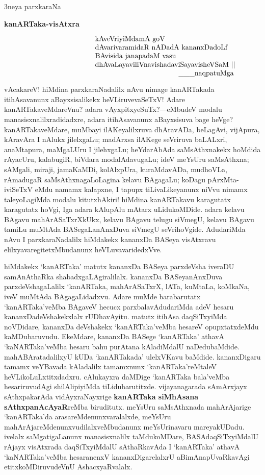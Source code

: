 \documentclass[11pt,a4size]{article}
\begin{document}
\newpage


\begin{center}
{\Huge 3neya parxkaraNa}

\smallskip
\textbf{\LARGE kanARTaka-visAtxra}
\end{center}

$$
\vbox{\parskip=0pt\parindent=0pt \everypar{\hskip12em} \obeylines
kAveVriyiMdamA goV
dAvarivaramidaR nADadA kananxDadoLf
BAvisida janapadaM vasu
dhAvaLayaviliVnavishadaviSayavisheVSaM ||

\hspace{4cm} \_\_\_naqpatuMga}\index{naqpatuMga}
$$

vAcakareV! hiMdina parxkaraNadalilx nAvu nimage kanARTakada
itihAsavanunx aBayxsisalikekx heVLiruvevaSeTxV! Adare
kanARTakaveMdareVnu? adara vAyxpitxyeSuTx?---eMbudeV modalu
manasisxnalilxradidadxre, adara itihAsavanunx aBayxsisuva bage heVge?
kanARTakaveMdare, muMbayi ilAKeyalilxruva dhAravADa, beLagAvi,
vijApura, kAravAra I nAlukx jilelxgaLu; madArxsa ilAKege seVriruva
baLALxri, anaMtapura, maMgaLUru I jilehxgaLu; heYdarAbAda
saMsAthxnakekx hoMdida rAyacUru, kalabugiR, biVdara modalAdavugaLu;
ideV meYsUru saMsAthxna; sAMgali, miraji, jamaKaMDi, kolAlxpUra,
kuraMdavADa, mudhoVLa, rAmadugaR saMsAthxnagaLoLagina kelavu BAgagaLu;
koDagu pArxMta-iviSeTxV eMdu namamx kalapxne, I tapupx
tiLivaLikeyanunx niVvu nimamx taleyoLagiMda modalu kitutxhAkiri!
hiMdina kanARTakavu karagutatx karagutatx hoVgi, Iga adara kAlupAlu
mAtarx uLidukoMDide. adara kelavu BAgavu mahArASaTxrXkUkx, kelavu
BAgavu telugu siVmegU, kelavu BAgavu tamiLu muMtAda BASegaLanAnxDuva
siVmegU seVrihoVgide. AdudariMda nAvu I parxkaraNadalilx hiMdakekx
kananxDa BASeya visAtxravu elilxyavaregitetxMbudanunx
heVLuvavaridedxVve.

hiMdakekx `kanARTaka' matutx kananxDa BASeya parxdeVsha iveraDU
samAnAthaRka shabadxgaLAgiralilalx. kananxDa BASeyanAnxDuva
parxdeVshagaLalilx `kanARTaka, mahArASaTxrX, lATa, kuMtaLa, koMkaNa,
iveV muMtAda BAgagaLidadxvu. Adare muMde barabarutatx `kanARTaka'veMba
BAgaveV hecucx parxbalavAdudariMda adeV hesaru kananxDadeVshakekxlalx
rUDhavAyitu. matutx itihAsa daqSiTxyiMda noVDidare, kananxDa
deVshakekx `kanARTaka'veMba hesareV opupxtatxdeMdu
kaMDubaruvudu. EkeMdare, kananxDa BASege `kanARTaka' athavA
`kaNARTaka'veMba hesaru bahu purAtana kAladiMdalU
naDedubaMdide. mahABAratadalilxyU kUDa `kanARTakada' ulelxVKavu
baMdide. kananxDigaru tamamx veYBavada kAladalilx tamamxnunx
`kanARTaka'reMtaleV heVLikoLuLxtitxdadxru. cAlukayxra daMDige
`kanARTaka bala'veMba hesariruvudAgi shilAlipiyiMda tiLidubarutitxde.
vijayanagarada sAmArxjayx sAthxpakarAda vidAyxraNayxrige
\textbf{kanARTaka siMhAsana sAthxpanAcAyaR}reMba biruditutx. meYsUru
saMsAthxnada mahArAjarige `kanARTaka'da arasareMdenunxvaralalxde,
meYsUru mahArAjareMdenunxvudilalxveMbudanunx meYsUrinavaru
mareyakUDadu. ivelalx saMgatigaLanunx manasisxnalilx taMdukoMDare,
BASAdaqSiTxyiMdalU rAjayx visAtxrada daqSiTxyiMdalU sAthaRkavAda I
`kanARTaka' athavA `kaNARTaka'veMba hesaranenxV kananxDigarelalxrU
aBimAnapUvaRkavAgi etitxkoMDiruvudeVnU AshacxyaRvalalx.
\end{document}
